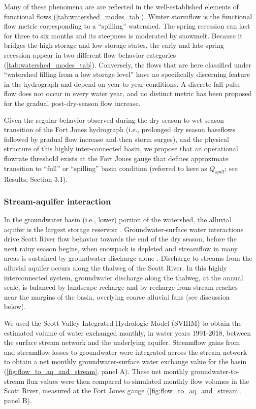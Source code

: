 \documentclass[hess, manuscript]{copernicus}
\begin{document}
Many of these phenomena are are reflected in the well-established
elements of functional flows (\autoref{tab:watershed_modes_tab}). Winter
stormflow is the functional flow metric corresponding to a ``spilling''
watershed. The spring recession can last for three to six months and its
steepness is moderated by snowmelt. Because it bridges the high-storage
and low-storage states, the early and late spring recession appear in
two different flow behavior categories
(\autoref{tab:watershed_modes_tab}). Conversely, the flows that are here
classified under ``watershed filling from a low storage level'' have no
specifically discerning feature in the hydrograph and depend on
year-to-year conditions. A discrete fall pulse flow does not occur in
every water year, and no distinct metric has been proposed for the
gradual post-dry-season flow increase.

Given the regular behavior observed during the dry season-to-wet season
transition of the Fort Jones hydrograph (i.e., prolonged dry season
baseflows followed by gradual flow increase and then storm surges), and
the physical structure of this highly inter-connected basin, we propose
that an operational flowrate threshold exists at the Fort Jones gauge
that defines approximate transition to ``full'' or ``spilling'' basin
condition (referred to here as \(Q_{spill}\); see Results, Section 3.1).

\subsubsection{Stream-aquifer interaction}

In the groundwater basin (i.e., lower) portion of the watershed, the
alluvial aquifer is the largest storage reservoir \citep{Mack1958}.
Groundwater-surface water interactions drive Scott River flow behavior
towards the end of the dry season, before the next rainy season begins,
when snowpack is depleted and streamflow in many areas is sustained by
groundwater discharge alone \citep{Foglia2018a}. Discharge to streams
from the alluvial aquifer occurs along the thalweg of the Scott River.
In this highly interconnected system, groundwater discharge along the
thalweg, at the annual scale, is balanced by landscape recharge and by
recharge from stream reaches near the margins of the basin, overlying
coarse alluvial fans (see discussion below).

We used the Scott Valley Integrated Hydrologic Model (SVIHM)
\citep{Tolley2019, Foglia2013a, Foglia2013b} to obtain the estimated
volume of water exchanged monthly, in water years 1991-2018, between the
surface stream network and the underlying aquifer. Streamflow gains from
and streamflow losses to groundwater were integrated across the stream
network to obtain a net monthly groundwater-surface water exchange value
for the basin (\autoref{fig:flow_to_aq_and_stream}, panel A). These net
monthly groundwater-to-stream flux values were then compared to
simulated monthly flow volumes in the Scott River, measured at the Fort
Jones gauge (\autoref{fig:flow_to_aq_and_stream}, panel B).
\end{document}
